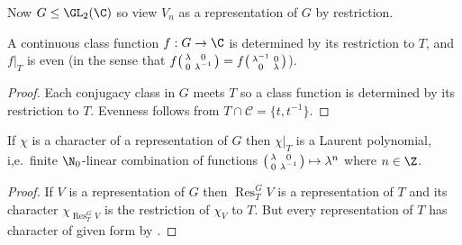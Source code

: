 \documentclass[a4paper]{article}
\newcommand{\ccl}{{\mathcal C}} %
\DeclareMathOperator{\Res}{Res} %
\theoremstyle{definition}
\begin{document}
Now \(G \leq \GL_2(\C)\) so view \(V_n\) as a representation of \(G\) by restriction.

\begin{lemma}
  \label{lem:represntation of SU(2) determined by its restriction to maximal torus}
  A continuous class function \(f: G \to \C\) is determined by its restriction to \(T\), and \(f|_T\) is even (in the sense that \(f
  \begin{psmallmatrix}
    \lambda & 0 \\
    0 & \lambda^{-1}
  \end{psmallmatrix}
  = f
  \begin{psmallmatrix}
    \lambda^{-1} & 0 \\
    0 & \lambda
  \end{psmallmatrix}
  \)).
\end{lemma}

\begin{proof}
  Each conjugacy class in \(G\) meets \(T\) so a class function is determined by its restriction to \(T\). Evenness follows from \(T \cap \ccl = \{t, t^{-1}\}\).
\end{proof}

\begin{lemma}
  If \(\chi\) is a character of a representation of \(G\) then \(\chi|_T\) is a Laurent polynomial, i,e.\ finite \(\N_0\)-linear combination of functions \(
  \begin{psmallmatrix}
    \lambda & 0 \\
    0 & \lambda^{-1}
  \end{psmallmatrix}
  \mapsto \lambda^n
  \) where \(n \in \Z\).
\end{lemma}

\begin{proof}
  If \(V\) is a representation of \(G\) then \(\Res^G_T V\) is a representation of \(T\) and its character \(\chi_{\Res^G_T V}\) is the restriction of \(\chi_V\) to \(T\). But every representation of \(T\) has character of given form by .
\end{proof}
\end{document}
